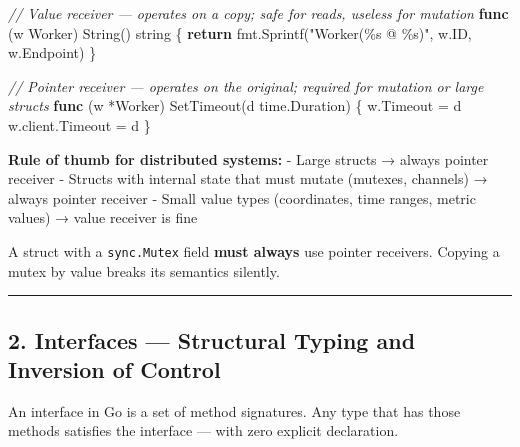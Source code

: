 \documentclass[
]{article}
\newenvironment{Shaded}{}{}
\newcommand{\CommentTok}[1]{\textcolor[rgb]{0.38,0.63,0.69}{\textit{#1}}}
\newcommand{\ControlFlowTok}[1]{\textcolor[rgb]{0.00,0.44,0.13}{\textbf{#1}}}
\newcommand{\DataTypeTok}[1]{\textcolor[rgb]{0.56,0.13,0.00}{#1}}
\newcommand{\KeywordTok}[1]{\textcolor[rgb]{0.00,0.44,0.13}{\textbf{#1}}}
\newcommand{\NormalTok}[1]{#1}
\newcommand{\OperatorTok}[1]{\textcolor[rgb]{0.40,0.40,0.40}{#1}}
\newcommand{\StringTok}[1]{\textcolor[rgb]{0.25,0.44,0.63}{#1}}
\begin{document}
\begin{Shaded}
\begin{Highlighting}[]
\CommentTok{// Value receiver — operates on a copy; safe for reads, useless for mutation}
\KeywordTok{func} \OperatorTok{(}\NormalTok{w Worker}\OperatorTok{)}\NormalTok{ String}\OperatorTok{()} \DataTypeTok{string} \OperatorTok{\{}
    \ControlFlowTok{return}\NormalTok{ fmt}\OperatorTok{.}\NormalTok{Sprintf}\OperatorTok{(}\StringTok{"Worker(\%s @ \%s)"}\OperatorTok{,}\NormalTok{ w}\OperatorTok{.}\NormalTok{ID}\OperatorTok{,}\NormalTok{ w}\OperatorTok{.}\NormalTok{Endpoint}\OperatorTok{)}
\OperatorTok{\}}

\CommentTok{// Pointer receiver — operates on the original; required for mutation or large structs}
\KeywordTok{func} \OperatorTok{(}\NormalTok{w }\OperatorTok{*}\NormalTok{Worker}\OperatorTok{)}\NormalTok{ SetTimeout}\OperatorTok{(}\NormalTok{d time}\OperatorTok{.}\NormalTok{Duration}\OperatorTok{)} \OperatorTok{\{}
\NormalTok{    w}\OperatorTok{.}\NormalTok{Timeout }\OperatorTok{=}\NormalTok{ d}
\NormalTok{    w}\OperatorTok{.}\NormalTok{client}\OperatorTok{.}\NormalTok{Timeout }\OperatorTok{=}\NormalTok{ d}
\OperatorTok{\}}
\end{Highlighting}
\end{Shaded}

\textbf{Rule of thumb for distributed systems:} - Large structs → always
pointer receiver - Structs with internal state that must mutate
(mutexes, channels) → always pointer receiver - Small value types
(coordinates, time ranges, metric values) → value receiver is fine

A struct with a \texttt{sync.Mutex} field \textbf{must always} use
pointer receivers. Copying a mutex by value breaks its semantics
silently.

\begin{center}\rule{0.5\linewidth}{0.5pt}\end{center}

\hypertarget{interfaces-structural-typing-and-inversion-of-control}{%
\subsection{2. Interfaces --- Structural Typing and Inversion of
Control}\label{interfaces-structural-typing-and-inversion-of-control}}

An interface in Go is a set of method signatures. Any type that has
those methods satisfies the interface --- with zero explicit
declaration.
\end{document}
